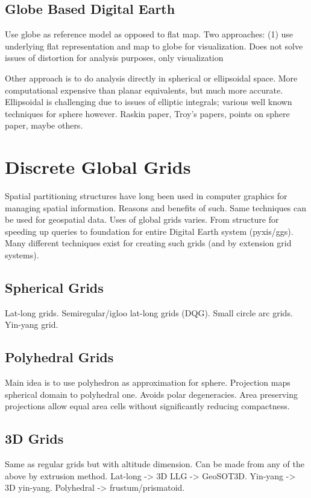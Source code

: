 \subsection{Globe Based Digital Earth}
Use globe as reference model as opposed to flat map.
Two approaches:
(1) use underlying flat representation and map to globe for visualization.
Does not solve issues of distortion for analysis purposes, only visualization


Other approach is to do analysis directly in spherical or ellipsoidal space.
More computational expensive than planar equivalents, but much more accurate.
Ellipsoidal is challenging due to issues of elliptic integrals; various well known techniques for sphere however.
Raskin paper, Troy's papers, points on sphere paper, maybe others.


\section{Discrete Global Grids}
Spatial partitioning structures have long been used in computer graphics for managing spatial information.
Reasons and benefits of such.
Same techniques can be used for geospatial data.
Uses of global grids varies.
From structure for speeding up queries to foundation for entire Digital Earth system (pyxis/ggs).
Many different techniques exist for creating such grids (and by extension grid systems).


\subsection{Spherical Grids}
Lat-long grids.
Semiregular/igloo lat-long grids (DQG).
Small circle arc grids.
Yin-yang grid.


\subsection{Polyhedral Grids}
Main idea is to use polyhedron as approximation for sphere.
Projection maps spherical domain to polyhedral one.
Avoids polar degeneracies.
Area preserving projections allow equal area cells without significantly reducing compactness.


\subsection{3D Grids}
Same as regular grids but with altitude dimension.
Can be made from any of the above by extrusion method.
Lat-long -> 3D LLG -> GeoSOT3D.
Yin-yang -> 3D yin-yang.
Polyhedral -> frustum/prismatoid.


